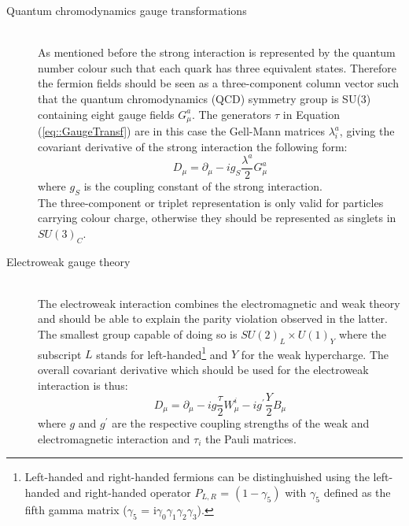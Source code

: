 \begin{myindentpar}
  \begin{description}
    \item[Quantum chromodynamics gauge transformations] \hfill \\
    As mentioned before the strong interaction is represented by the quantum number colour such that each quark has three equivalent states. Therefore the fermion fields should be seen as a three-component column vector such that the quantum chromodynamics (QCD) symmetry group is SU(3) containing eight gauge fields $G_{\mu}^{a}$. 
    The generators $\tau$ in Equation (\ref{eq::GaugeTransf}) are in this case the Gell-Mann matrices $\lambda_{i}^{a}$, giving the covariant derivative of the strong interaction the following form:
    \begin{equation}
      D_{\mu} = \partial_{\mu} - i g_{S} \frac{\lambda^{a}}{2} G_{\mu}^a
    \end{equation}
    where $g_{S}$ is the coupling constant of the strong interaction. \\
    The three-component or triplet representation is only valid for particles carrying colour charge, otherwise they should be represented as singlets in $SU(3)_{C}$. 
    
    \item[Electroweak gauge theory] \hfill \\
    The electroweak interaction combines the electromagnetic and weak theory and should be able to explain the parity violation observed in the latter. The smallest group capable of doing so is $SU(2)_{L} \times U(1)_{Y}$ where the subscript $L$ stands for left-handed\footnote{
      Left-handed and right-handed fermions can be distinghuished using the left-handed and right-handed operator $P_{L,R}$ = $(1 - \gamma_{5})$ with $\gamma_5$ defined as the fifth gamma matrix ($\gamma_5$ = i$\gamma_0 \gamma_1 \gamma_2 \gamma_3$). 
    }
    and $Y$ for the weak hypercharge.
    The overall covariant derivative which should be used for the electroweak interaction is thus:
    \begin{equation}
     D_{\mu} = \partial_{\mu} - i g \frac{\tau}{2} W_{\mu}^{i} - i g^{'} \frac{Y}{2} B_{\mu}
    \end{equation}
    where $g$ and $g^{'}$ are the respective coupling strengths of the weak and electromagnetic interaction and $\tau_{i}$ the Pauli matrices. 
    

\end{description}
\end{myindentpar}
